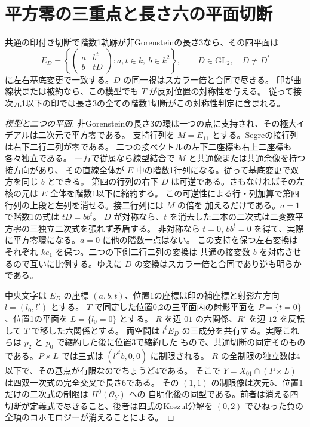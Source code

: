 \section{平方零の三重点と長さ六の平面切断}
\label{sec:finite-marked-planar-triple}
\begin{theorem}\label{thm:finite-marked-planar-triple}
共通の印付き切断で階数1軌跡が非Gorensteinの長さ3なら、その四平面は
\[
 E_D=\left\{\begin{pmatrix}a&b^t\\ b&tD\end{pmatrix}:
       a,t\in k,\ b\in k^2\right\},\qquad D\in\mathrm{GL}_2,\quad D\ne D^t
\]
に左右基底変更で一致する。$D$ の同一視はスカラー倍と合同で尽きる。
印が曲線状または被約なら、この模型でも $T$ が反対位置の対称性を与える。
従って接次元1以下の印では長さ3の全ての階数1切断がこの対称性判定に含まれる。
\end{theorem}
\begin{proof}[模型と二つの平面]
非Gorensteinの長さ3の環は一つの点に支持され、その極大イデアルは二次元で平方零である。
支持行列を $M=E_{11}$ とする。Segreの接行列は右下二行二列が零である。
二つの接ベクトルの左下二座標も右上二座標も各々独立である。
一方で従属なら線型結合で $M$ と共通像または共通余像を持つ接方向があり、
その直線全体が $E$ 中の階数1行列になる。従って基底変更で双方を同じ $b$ とできる。
第四の行列の右下 $D$ は可逆である。さもなければその左核の元は $E$ 全体を階数1以下に縮約する。
この可逆性による行・列加算で第四行列の上段と左列を消せる。接二行列には $M$ の倍を
加えるだけである。$a=1$ で階数1の式は $tD=bb^t$。
$D$ が対称なら、$t$ を消去した二本の二次式は二変数平方零の三独立二次式を張れず矛盾する。
非対称なら $t=0$, $bb^t=0$ を得て、実際に平方零環になる。$a=0$ に他の階数一点はない。
この支持を保つ左右変換はそれぞれ $ke_1$ を保つ。二つの下側二行二列の変換は
共通の接変数 $b$ を対応させるので互いに比例する。ゆえに $D$ の変換はスカラー倍と合同であり逆も明らかである。

中央文字は $E_D$ の座標 $(a,b,t)$、位置1の座標は印の補座標と射影左方向 $l=(l_0,l')$ とする。
$T$ で同定した位置0,2の三平面内の射影平面を $P=\{t=0\}$、位置1の平面を $L=\{l_0=0\}$ とする。
$R$ を辺 $01$ の六関係、$R'$ を辺 $12$ を反転して $T$ で移した六関係とする。
両空間は $l^t E_D$ の三成分を共有する。実際これらは $p_2$ と $p_0$ で縮約した後に位置3で縮約した
もので、共通切断の同定そのものである。$P\times L$ では三式は $(l'^t b,0,0)$ に制限される。
$R$ の全制限の独立数は4以下で、その基点が有限なのでちょうど4である。
そこで $Y=X_{01}\cap(P\times L)$ は四双一次式の完全交叉で長さ6である。
その $(1,1)$ の制限像は次元5、位置1だけの二次式の制限は $H^0(\mathcal O_Y)$ への
自明化後の同型である。前者は消える四切断が定義式で尽きること、後者は四式のKoszul分解を
$(0,2)$ でひねった負の全項のコホモロジーが消えることによる。

\end{proof}
